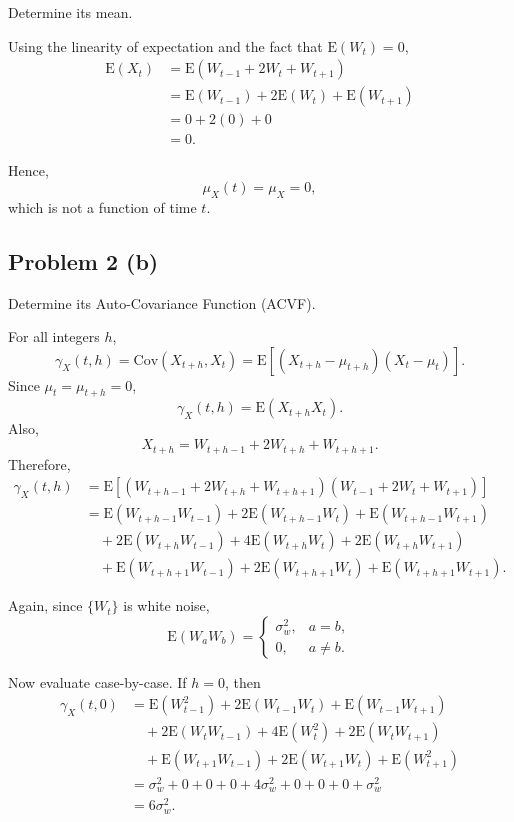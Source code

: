 \documentclass[
  10pt,
]{extarticle}
\begin{document}
\begin{problem}[Problem 2 (a)]
Determine its mean.
\end{problem}

Using the linearity of expectation and the fact that \(\mathrm{E}(W_t)=0\),
\[
\begin{aligned}
\mathrm{E}(X_t)
&= \mathrm{E}(W_{t-1} + 2W_t + W_{t+1}) \\
&= \mathrm{E}(W_{t-1}) + 2\mathrm{E}(W_t) + \mathrm{E}(W_{t+1}) \\
&= 0 + 2(0) + 0 \\
&= 0.
\end{aligned}
\]

Hence,
\[
\mu_X(t) = \mu_X = 0,
\]
which is not a function of time \(t\).

\newpage

\subsection{Problem 2 (b)}\label{problem-2-b}

\begin{problem}[Problem 2 (b)]
Determine its Auto-Covariance Function (ACVF).
\end{problem}

For all integers \(h\),
\[
\gamma_X(t,h) = \mathrm{Cov}(X_{t+h},X_t) = \mathrm{E}[(X_{t+h}-\mu_{t+h})(X_t-\mu_t)].
\]
Since \(\mu_t = \mu_{t+h} = 0\),
\[
\gamma_X(t,h) = \mathrm{E}(X_{t+h}X_t).
\]
Also,
\[
X_{t+h} = W_{t+h-1} + 2W_{t+h} + W_{t+h+1}.
\]
Therefore,
\[
\begin{aligned}
\gamma_X(t,h)
&= \mathrm{E}[(W_{t+h-1} + 2W_{t+h} + W_{t+h+1})(W_{t-1} + 2W_t + W_{t+1})] \\
&= \mathrm{E}(W_{t+h-1}W_{t-1})
 + 2\mathrm{E}(W_{t+h-1}W_t)
 + \mathrm{E}(W_{t+h-1}W_{t+1}) \\
&\quad + 2\mathrm{E}(W_{t+h}W_{t-1})
 + 4\mathrm{E}(W_{t+h}W_t)
 + 2\mathrm{E}(W_{t+h}W_{t+1}) \\
&\quad + \mathrm{E}(W_{t+h+1}W_{t-1})
 + 2\mathrm{E}(W_{t+h+1}W_t)
 + \mathrm{E}(W_{t+h+1}W_{t+1}).
\end{aligned}
\]

Again, since \(\{W_t\}\) is white noise,
\[
\mathrm{E}(W_aW_b) =
\begin{cases}
\sigma_w^2, & a=b,\\
0, & a \neq b.
\end{cases}
\]

Now evaluate case-by-case. If \(h=0\), then
\[
\begin{aligned}
\gamma_X(t,0)
&= \mathrm{E}(W_{t-1}^2)
 + 2\mathrm{E}(W_{t-1}W_t)
 + \mathrm{E}(W_{t-1}W_{t+1}) \\
&\quad + 2\mathrm{E}(W_tW_{t-1})
 + 4\mathrm{E}(W_t^2)
 + 2\mathrm{E}(W_tW_{t+1}) \\
&\quad + \mathrm{E}(W_{t+1}W_{t-1})
 + 2\mathrm{E}(W_{t+1}W_t)
 + \mathrm{E}(W_{t+1}^2) \\
&= \sigma_w^2 + 0 + 0 + 0 + 4\sigma_w^2 + 0 + 0 + 0 + \sigma_w^2 \\
&= 6\sigma_w^2.
\end{aligned}
\]
\end{document}
